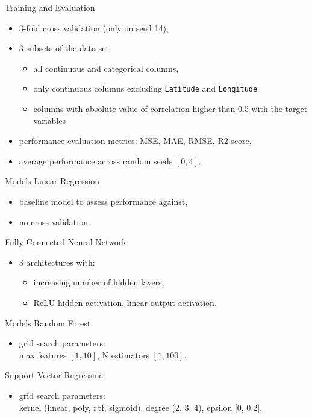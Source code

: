 \documentclass{beamer} %
\begin{document}
\begin{frame}{Training and Evaluation}
  \vspace{-1cm}
  \begin{itemize}
      \item 3-fold cross validation (only on seed 14),
      \item 3 subsets of the data set:
        \begin{itemize}
            \item all continuous and categorical columns,
            \item only continuous columns excluding \texttt{Latitude} and \texttt{Longitude}
            \item columns with absolute value of correlation higher than 0.5 with the target variables
        \end{itemize}
      \item performance evaluation metrics: MSE, MAE, RMSE, R2 score,
      \item average performance across random seeds $[0, 4]$.
  \end{itemize}
\end{frame}

\begin{frame}{Models}
  \vspace{-0.5cm}
  Linear Regression
  \begin{itemize}
      \item baseline model to assess performance against,
      \item no cross validation.
  \end{itemize}
  Fully Connected Neural Network
  \begin{itemize}
      \item 3 architectures with:
        \begin{itemize}
            \item increasing number of hidden layers,
            \item ReLU hidden activation, linear output activation.
        \end{itemize}
  \end{itemize}
\end{frame}

\begin{frame}{Models}
  \vspace{-0.5cm}
  Random Forest
  \begin{itemize}
      \item grid search parameters:\\
      max features $[1, 10]$, N estimators $[1, 100]$.
  \end{itemize}
  Support Vector Regression
  \begin{itemize}
      \item grid search parameters:\\
      kernel (linear, poly, rbf, sigmoid), degree (2, 3, 4), epsilon [0, 0.2].
  \end{itemize}
\end{frame}
\end{document}
